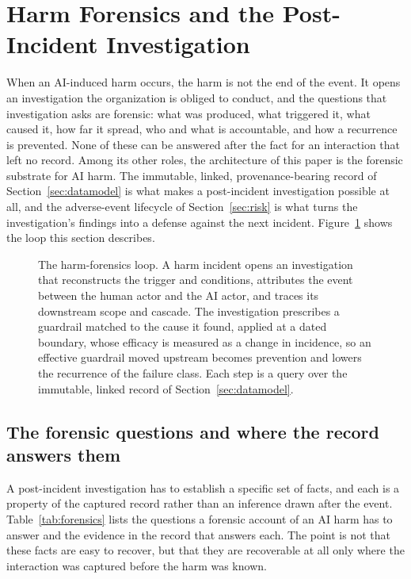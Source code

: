 \documentclass[11pt]{article}
\begin{document}
\section{Harm Forensics and the Post-Incident Investigation}
\label{sec:forensics}

When an AI-induced harm occurs, the harm is not the end of the event. It opens an
investigation the organization is obliged to conduct, and the questions that
investigation asks are forensic: what was produced, what triggered it, what caused
it, how far it spread, who and what is accountable, and how a recurrence is
prevented. None of these can be answered after the fact for an interaction that
left no record. Among its other roles, the architecture of this paper is the
forensic substrate for AI harm. The immutable, linked, provenance-bearing record
of Section~\ref{sec:datamodel} is what makes a post-incident investigation
possible at all, and the adverse-event lifecycle of Section~\ref{sec:risk} is what
turns the investigation's findings into a defense against the next incident.
Figure~\ref{fig:forensics} shows the loop this section describes.

\begin{figure}[t]
\centering
\resizebox{\textwidth}{!}{}
\caption{The harm-forensics loop. A harm incident opens an investigation that
reconstructs the trigger and conditions, attributes the event between the human
actor and the AI actor, and traces its downstream scope and cascade. The
investigation prescribes a guardrail matched to the cause it found, applied at a
dated boundary, whose efficacy is measured as a change in incidence, so an
effective guardrail moved upstream becomes prevention and lowers the recurrence of
the failure class. Each step is a query over the immutable, linked record of
Section~\ref{sec:datamodel}.}
\label{fig:forensics}
\end{figure}

\subsection{The forensic questions and where the record answers them}

A post-incident investigation has to establish a specific set of facts, and each
is a property of the captured record rather than an inference drawn after the
event. Table~\ref{tab:forensics} lists the questions a forensic account of an AI
harm has to answer and the evidence in the record that answers each. The point is
not that these facts are easy to recover, but that they are recoverable at all
only where the interaction was captured before the harm was known.
\end{document}
